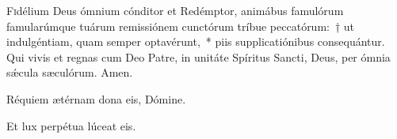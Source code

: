 \documentclass[vesperale_romanum]{subfiles}
\begin{document}
\lettrine{F}{i}délium Deus ómnium cónditor et Redémptor, animábus famulórum famularúmque tuárum remissiónem cunctórum tríbue peccatórum:~† ut indulgéntiam, quam semper optavérunt,~* piis supplicatiónibus consequántur. Qui vivis et regnas cum Deo Patre, in unitáte Spíritus Sancti, Deus, per ómnia sǽcula sæculórum.
\rr Amen.

\label{vv_requiem_etc}

\vv Réquiem ætérnam dona eis, Dómine.

\rr Et lux perpétua lúceat eis.


\end{document}
